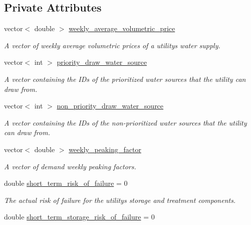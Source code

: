 \subsection*{Private Attributes}
\begin{DoxyCompactItemize}
\item 
vector$<$ double $>$ \mbox{\hyperlink{classUtility_acb779ceddbc1820c8bec7b2f87886d7c}{weekly\+\_\+average\+\_\+volumetric\+\_\+price}}
\begin{DoxyCompactList}\small\item\em A vector of weekly average volumetric prices of a utility\textquotesingle{}s water supply. \end{DoxyCompactList}\item 
vector$<$ int $>$ \mbox{\hyperlink{classUtility_aee22e0941d0116dffa927afac2fd17f9}{priority\+\_\+draw\+\_\+water\+\_\+source}}
\begin{DoxyCompactList}\small\item\em A vector containing the I\+Ds of the prioritized water sources that the utility can draw from. \end{DoxyCompactList}\item 
vector$<$ int $>$ \mbox{\hyperlink{classUtility_a815d7d43f3aca319f717c4e742b19df4}{non\+\_\+priority\+\_\+draw\+\_\+water\+\_\+source}}
\begin{DoxyCompactList}\small\item\em A vector containing the I\+Ds of the non-\/prioritized water sources that the utility can draw from. \end{DoxyCompactList}\item 
vector$<$ double $>$ \mbox{\hyperlink{classUtility_abcafce1d14d59e9631c07bf49a131b0d}{weekly\+\_\+peaking\+\_\+factor}}
\begin{DoxyCompactList}\small\item\em A vector of demand weekly peaking factors. \end{DoxyCompactList}\item 
double \mbox{\hyperlink{classUtility_a13be6c9b210e5f080785b7e2e0c35566}{short\+\_\+term\+\_\+risk\+\_\+of\+\_\+failure}} = 0
\begin{DoxyCompactList}\small\item\em The actual risk of failure for the utility\textquotesingle{}s storage and treatment components. \end{DoxyCompactList}\item 
double \mbox{\hyperlink{classUtility_a9ba85088c397dac2e636b6c42490cf2e}{short\+\_\+term\+\_\+storage\+\_\+risk\+\_\+of\+\_\+failure}} = 0

\end{DoxyCompactItemize}

